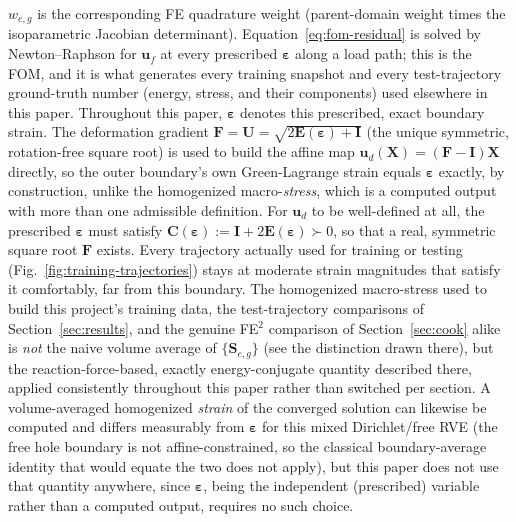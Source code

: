 \documentclass[10pt,a4paper]{article}
\begin{document}
$w_{e,g}$ is the
corresponding FE quadrature weight (parent-domain weight times the
isoparametric Jacobian determinant). Equation~\eqref{eq:fom-residual} is
solved by Newton--Raphson for $\bm u_f$ at every prescribed $\bm\varepsilon$ along a
load path; this is the FOM, and it is what generates every training
snapshot and every test-trajectory ground-truth number (energy, stress, and their
components) used elsewhere in this paper. Throughout this paper,
$\bm\varepsilon$ denotes this prescribed, exact boundary strain. The
deformation gradient $\bm F=\bm U=\sqrt{2\bm E(\bm\varepsilon)+\bm I}$
(the unique symmetric, rotation-free square root) is used to build the
affine map $\bm u_d(\bm X)=(\bm F-\bm I)\bm X$ directly, so the outer
boundary's own Green-Lagrange strain equals $\bm\varepsilon$ exactly, by
construction, unlike the homogenized macro-\emph{stress}, which is a
computed output with more than one admissible definition. For $\bm
u_d$ to be well-defined at all, the prescribed $\bm\varepsilon$ must
satisfy $\bm C(\bm\varepsilon):=\bm I+2\bm E(\bm\varepsilon)\succ0$, so
that a real, symmetric square root $\bm F$ exists. Every
trajectory actually used for training or testing (Fig.~\ref{fig:training-trajectories})
stays at moderate strain magnitudes that satisfy it comfortably, far
from this boundary. The
homogenized macro-stress
used to build this project's training data, the test-trajectory
comparisons of Section~\ref{sec:results}, and the genuine FE$^2$
comparison of Section~\ref{sec:cook} alike is \emph{not} the naive
volume average of $\{\bm S_{e,g}\}$ (see the distinction drawn there),
but the reaction-force-based, exactly energy-conjugate quantity
described there, applied consistently throughout this paper rather
than switched per section. A volume-averaged
homogenized \emph{strain} of the converged solution can likewise be
computed and differs measurably from $\bm\varepsilon$ for this
mixed Dirichlet/free RVE (the free hole boundary is not affine-constrained,
so the classical boundary-average identity that would equate the two
does not apply), but this paper does not use that quantity anywhere, since
$\bm\varepsilon$, being the independent (prescribed) variable rather
than a computed output, requires no such choice.
\end{document}
